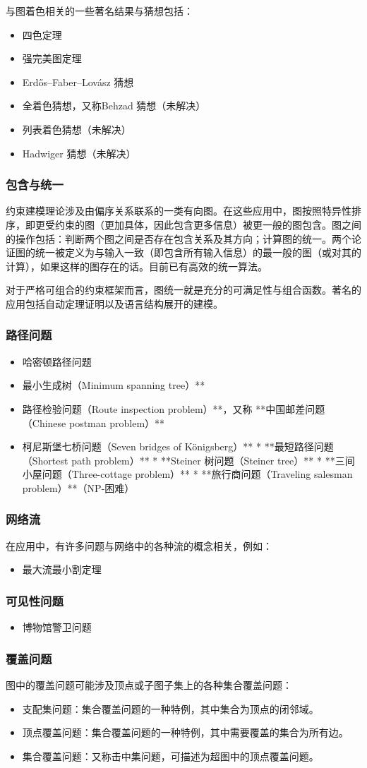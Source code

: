 与图着色相关的一些著名结果与猜想包括：
\begin{itemize}
\item 四色定理
\item 强完美图定理
\item Erdős–Faber–Lovász 猜想
\item 全着色猜想，又称Behzad 猜想（未解决）
\item 列表着色猜想（未解决）
\item Hadwiger 猜想（未解决）
\end{itemize}
\subsubsection{包含与统一}
约束建模理论涉及由偏序关系联系的一类有向图。在这些应用中，图按照特异性排序，即更受约束的图（更加具体，因此包含更多信息）被更一般的图包含。图之间的操作包括：判断两个图之间是否存在包含关系及其方向；计算图的统一。两个论证图的统一被定义为与输入一致（即包含所有输入信息）的最一般的图（或对其的计算），如果这样的图存在的话。目前已有高效的统一算法。

对于严格可组合的约束框架而言，图统一就是充分的可满足性与组合函数。著名的应用包括自动定理证明以及语言结构展开的建模。
\subsubsection{路径问题}
\begin{itemize}
\item 哈密顿路径问题
\item 最小生成树（Minimum spanning tree）**
\item 路径检验问题（Route inspection problem）**，又称 **中国邮差问题（Chinese postman problem）**
\item 柯尼斯堡七桥问题（Seven bridges of Königsberg）**
* **最短路径问题（Shortest path problem）**
* **Steiner 树问题（Steiner tree）**
* **三间小屋问题（Three-cottage problem）**
* **旅行商问题（Traveling salesman problem）**（NP-困难）
\end{itemize}

\subsubsection{网络流}
在应用中，有许多问题与网络中的各种流的概念相关，例如：
\begin{itemize}
\item 最大流最小割定理
\end{itemize}
\subsubsection{可见性问题}
\begin{itemize}
\item 博物馆警卫问题
\end{itemize}
\subsubsection{覆盖问题}
图中的覆盖问题可能涉及顶点或子图子集上的各种集合覆盖问题：
\begin{itemize}
\item 支配集问题：集合覆盖问题的一种特例，其中集合为顶点的闭邻域。
\item 顶点覆盖问题：集合覆盖问题的一种特例，其中需要覆盖的集合为所有边。
\item 集合覆盖问题：又称击中集问题，可描述为超图中的顶点覆盖问题。
\end{itemize}
